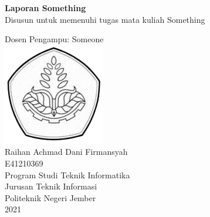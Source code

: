 \documentclass[a4paper, 12pt]{article}
\begin{document}
\begin{center}



  {\huge \bfseries Laporan Something}
  \\[0.7em]


  Disusun untuk memenuhi tugas mata kuliah 
  {Something}


  Dosen Pengampu: 
  {Someone}
  \\[5em]


  \includegraphics[width=12em]{figs/poliyeay-bw.png}
  \\[3em]


  {\large Raihan Achmad Dani Firmansyah}
  \\[0.7em]
  {\large E41210369}
  \\[10em]


  {\Large Program Studi Teknik Informatika}
    \\[0.7em]
  {\Large Jurusan Teknik Informasi}
    \\[0.7em]
  {\Large Politeknik Negeri Jember}
    \\[0.7em]
  {\Large 2021}


\end{center}
\end{document}
